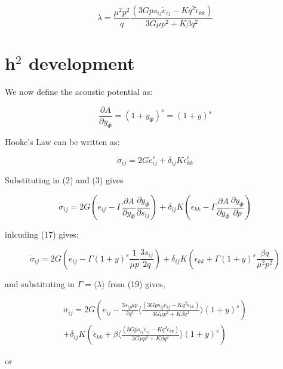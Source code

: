 \documentclass[a4paper]{article}
\begin{document}
\begin{equation}
\lambda = \frac{\mu^2 p^2}{q}\frac{(3Gps_{ij}\dot e_{ij} - Kq^2\dot\epsilon_{kk})}
{3G\mu p^2 + K\beta q^2}
\end{equation}

\section{h$^2$ development}

We now define the acoustic potential as:

\begin{equation}
\frac{\partial A}{\partial y_\Phi} = (1+y_\Phi)^s = (1+y)^s
\end{equation}

Hooke's Law can be written as:

\begin{equation}
\dot\sigma_{ij} = 2G\dot e^e_{ij} + \delta_{ij}K\dot\epsilon^e_{kk}
\end{equation}

Substituting in (2) and (3) gives

\begin{equation}
\dot\sigma_{ij} = 2G\left(\dot e_{ij} - \Gamma\frac{\partial A}{\partial y_\Phi}\frac{\partial y_\Phi}{\partial s_{ij}}\right) + \delta_{ij}K\left(\dot\epsilon_{kk} - \Gamma\frac{\partial A}{\partial y_\Phi}\frac{\partial y_\Phi}{\partial p}\right)
\end{equation}

inlcuding (17) gives:

\begin{equation}
\dot\sigma_{ij} = 2G\left(\dot e_{ij} - \Gamma(1+y)^s\frac{1}{\mu p}\frac{3s_{ij}}{2q}\right) + \delta_{ij}K\left(\dot\epsilon_{kk} + \Gamma(1+y)^s\frac{\beta q}{\mu^2 p^2}\right)
\end{equation}

and substituting in $\Gamma=\langle\lambda\rangle$ from (19) gives,

\begin{eqnarray}
\dot\sigma_{ij} = 2G\left(\dot e_{ij} - \frac{3s_{ij}\mu p}{2q^2}\langle\frac{(3Gps_{ij}\dot e_{ij} - Kq^2\dot\epsilon_{kk})}
{3G\mu p^2 + K\beta q^2}\rangle
(1+y)^s\right) \nonumber \\
+ \delta_{ij}K\left(\dot\epsilon_{kk} + \beta\langle\frac{(3Gps_{ij}\dot e_{ij} - Kq^2\dot\epsilon_{kk})}
{3G\mu p^2 + K\beta q^2}\rangle(1+y)^s\right)
\end{eqnarray}

or
\end{document}
